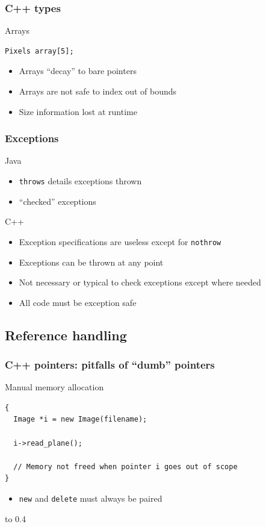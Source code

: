 \documentclass[handout]{beamer}
\begin{document}
\begin{frame}[fragile]
  \frametitle{C++ types}
  \begin{block}{Arrays}
  \begin{lstlisting}
Pixels array[5];
\end{lstlisting}
  \begin{itemize}
    \pause
  \item Arrays “decay” to bare pointers
    \pause
  \item Arrays are not safe to index out of bounds
    \pause
  \item Size information lost at runtime
  \end{itemize}
  \end{block}
\end{frame}

\begin{frame}[fragile]
  \frametitle{Exceptions}
  \begin{block}{Java}
    \begin{itemize}
    \item \texttt{throws} details exceptions thrown
    \item “checked” exceptions
    \end{itemize}
  \end{block}
  \begin{block}{C++}
    \begin{itemize}
    \item Exception specifications are useless except for \texttt{nothrow}
      \pause
    \item Exceptions can be thrown at any point
      \pause
    \item Not necessary or typical to check exceptions except where needed
      \pause
    \item All code must be exception safe
    \end{itemize}
  \end{block}
\end{frame}

\subsection{Reference handling}

\begin{frame}[fragile]
  \frametitle{C++ pointers: pitfalls of “dumb” pointers}
\begin{block}{Manual memory allocation}
  \begin{lstlisting}
{
  Image *i = new Image(filename);

  i->read_plane();

  // Memory not freed when pointer i goes out of scope
}
\end{lstlisting}
  \begin{itemize}
    \pause
  \item \texttt{new} and \texttt{delete} must always be paired
  \end{itemize}
\end{block}
\vbox to 0.4\textheight{%
}%
\end{frame}
\end{document}
